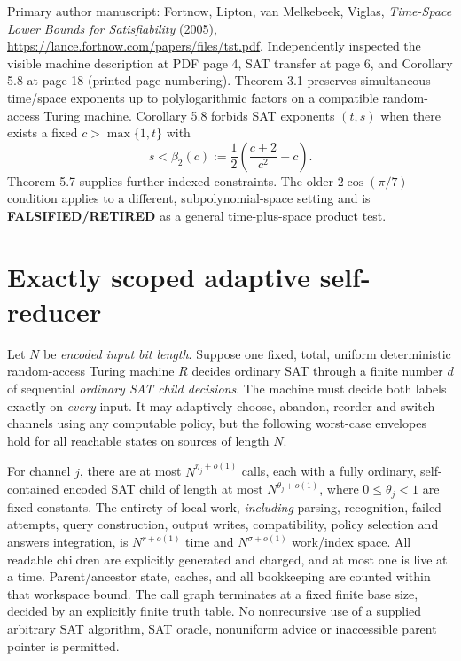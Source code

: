 \documentclass[11pt]{article}
\begin{document}
Primary author manuscript: Fortnow, Lipton, van Melkebeek, Viglas, \emph{Time-Space Lower Bounds for Satisfiability} (2005), \url{https://lance.fortnow.com/papers/files/tst.pdf}. Independently inspected the visible machine description at PDF page 4, SAT transfer at page 6, and Corollary 5.8 at page 18 (printed page numbering). Theorem 3.1 preserves simultaneous time/space exponents up to polylogarithmic factors on a compatible random-access Turing machine. Corollary 5.8 forbids SAT exponents $(t,s)$ when there exists a fixed $c>\max\{1,t\}$ with
\[
 s<\beta_2(c):=\frac12\left(\frac{c+2}{c^2}-c\right).
\]
Theorem 5.7 supplies further indexed constraints. The older $2\cos(\pi/7)$ condition applies to a different, subpolynomial-space setting and is \textbf{FALSIFIED/RETIRED} as a general time-plus-space product test.

\section{Exactly scoped adaptive self-reducer}
Let $N$ be \emph{encoded input bit length}. Suppose one fixed, total, uniform deterministic random-access Turing machine $R$ decides ordinary SAT through a finite number $d$ of sequential \emph{ordinary SAT child decisions}. The machine must decide both labels exactly on \emph{every} input. It may adaptively choose, abandon, reorder and switch channels using any computable policy, but the following worst-case envelopes hold for all reachable states on sources of length $N$.

For channel $j$, there are at most $N^{\eta_j+o(1)}$ calls, each with a fully ordinary, self-contained encoded SAT child of length at most $N^{\theta_j+o(1)}$, where $0\le\theta_j<1$ are fixed constants. The entirety of local work, \emph{including} parsing, recognition, failed attempts, query construction, output writes, compatibility, policy selection and answers integration, is $N^{r+o(1)}$ time and $N^{\sigma+o(1)}$ work/index space. All readable children are explicitly generated and charged, and at most one is live at a time. Parent/ancestor state, caches, and all bookkeeping are counted within that workspace bound. The call graph terminates at a fixed finite base size, decided by an explicitly finite truth table. No nonrecursive use of a supplied arbitrary SAT algorithm, SAT oracle, nonuniform advice or inaccessible parent pointer is permitted.
\end{document}
